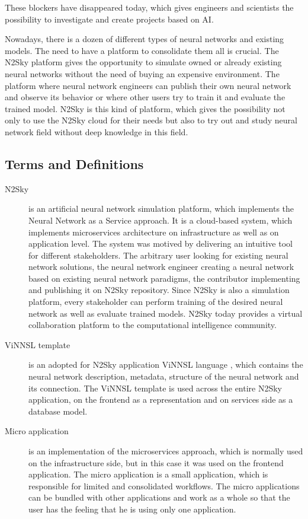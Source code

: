These blockers have disappeared today, which gives engineers and scientists the possibility to investigate and create projects based on AI. 

Nowadays, there is a dozen of different types of neural networks and existing models. The need to have a platform to consolidate them all is crucial. The N2Sky platform gives the opportunity to simulate owned or already existing neural networks without the need of buying an expensive environment. The platform where neural network engineers can publish their own neural network and observe its behavior or where other users try to train it and evaluate the trained model. N2Sky is this kind of platform, which gives the possibility not only to use the N2Sky cloud for their needs but also to try out and study neural network field without deep knowledge in this field. 



\subsection{Terms and Definitions}\label{Terms and definitions}

\begin{description}
\item[N2Sky] is an artificial neural network simulation platform, which implements the Neural Network as a Service approach. It is a cloud-based system, which implements microservices architecture on infrastructure as well as on application level. The system was motived by delivering an intuitive tool for different stakeholders. The arbitrary user looking for existing neural network solutions, the neural network engineer creating a neural network based on existing neural network paradigms, the contributor implementing and publishing it on N2Sky repository. Since N2Sky is also a simulation platform, every stakeholder can perform training of the desired neural network as well as evaluate trained models.  N2Sky today provides a virtual collaboration platform to the computational intelligence community.
\item[ViNNSL template] is an adopted for N2Sky application ViNNSL language \cite{Beran2008} , which contains the neural network description, metadata, structure of the neural network and its connection. The ViNNSL template is used across the entire N2Sky application, on the frontend as a representation and on services side as a database model.
\item[Micro application] is an implementation of the microservices approach, which is normally used on the infrastructure side, but in this case it was used on the frontend application. The micro application is a small application, which is responsible for limited and consolidated workflows. The micro applications can be bundled with other applications and work as a whole so that the user has the feeling that he is using only one application.
\end{description}




